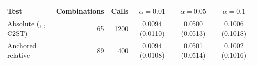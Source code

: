 \begin{tabular}{lrrccc}
\toprule
Test & Combinations & Calls & $\alpha=0.01$ & $\alpha=0.05$ & $\alpha=0.1$ \\
\midrule
Absolute (\WC{}, \LRC{}, C2ST) & 65 & 1200 & 0.0094 (0.0110) & 0.0500 (0.0513) & 0.1006 (0.1018) \\
Anchored relative & 89 & 400 & 0.0094 (0.0108) & 0.0501 (0.0514) & 0.1002 (0.1016) \\
\bottomrule
\end{tabular}
